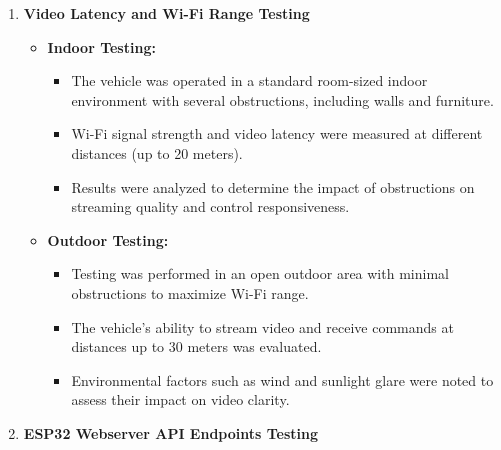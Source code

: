 \documentclass[12pt,a4paper]{report}
\begin{document}
\begin{enumerate}
    \item \textbf{Video Latency and Wi-Fi Range Testing}
    \begin{itemize}
        \item \textbf{Indoor Testing:}
        \begin{itemize}
            \item The vehicle was operated in a standard room-sized indoor environment with several obstructions, including walls and furniture.
            \item Wi-Fi signal strength and video latency were measured at different distances (up to 20 meters).
            \item Results were analyzed to determine the impact of obstructions on streaming quality and control responsiveness.
        \end{itemize}
        \item \textbf{Outdoor Testing:}
        \begin{itemize}
            \item Testing was performed in an open outdoor area with minimal obstructions to maximize Wi-Fi range.
            \item The vehicle’s ability to stream video and receive commands at distances up to 30 meters was evaluated.
            \item Environmental factors such as wind and sunlight glare were noted to assess their impact on video clarity.
        \end{itemize}
    \end{itemize}




\item \textbf{ESP32 Webserver API Endpoints Testing}
   \begin{itemize}


\end{itemize}
\end{enumerate}
\end{document}
